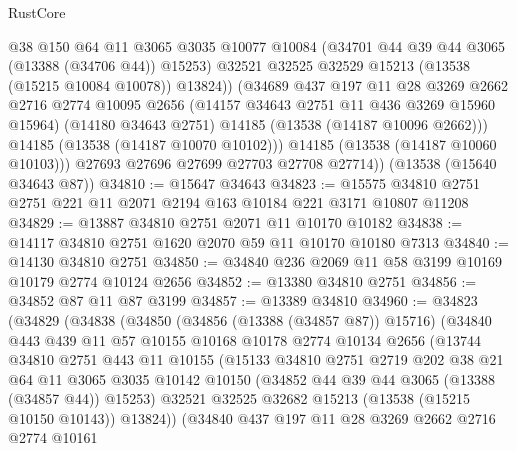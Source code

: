 \begin{lexlean}{RustCore}
\begin{coremodule}
                @38
                @150
                @64
                @11
                @3065
                @3035
                @10077
                @10084
                (@34701 @44 @39 @44 @3065 (@13388 (@34706 @44)) @15253)
                @32521
                @32525
                @32529
                @15213
                (@13538 (@15215 @10084 @10078))
                @13824))
            (@34689
              @437
              @197
              @11
              @28
              @3269
              @2662
              @2716
              @2774
              @10095
              @2656
              (@14157 @34643 @2751 @11 @436 @3269 @15960 @15964)
              (@14180 @34643 @2751)
              @14185
              (@13538 (@14187 @10096 @2662)))
            @14185
            (@13538 (@14187 @10070 @10102)))
          @14185
          (@13538 (@14187 @10060 @10103)))
        @27693
        @27696
        @27699
        @27703
        @27708
        @27714))
    (@13538 (@15640 @34643 @87))
@34810 := @15647 @34643
@34823 := @15575 @34810 @2751 @2751 @221 @11 @2071 @2194 @163 @10184 @221 @3171 @10807 @11208
@34829 := @13887 @34810 @2751 @2071 @11 @10170 @10182
@34838 := @14117 @34810 @2751 @1620 @2070 @59 @11 @10170 @10180 @7313
@34840 := @14130 @34810 @2751
@34850 := @34840 @236 @2069 @11 @58 @3199 @10169 @10179 @2774 @10124 @2656
@34852 := @13380 @34810 @2751
@34856 := @34852 @87 @11 @87 @3199
@34857 := @13389 @34810
@34960 := @34823
    (@34829
      (@34838
        (@34850
          (@34856 (@13388 (@34857 @87)) @15716)
          (@34840
            @443
            @439
            @11
            @57
            @10155
            @10168
            @10178
            @2774
            @10134
            @2656
            (@13744
              @34810
              @2751
              @443
              @11
              @10155
              (@15133
                @34810
                @2751
                @2719
                @202
                @38
                @21
                @64
                @11
                @3065
                @3035
                @10142
                @10150
                (@34852 @44 @39 @44 @3065 (@13388 (@34857 @44)) @15253)
                @32521
                @32525
                @32682
                @15213
                (@13538 (@15215 @10150 @10143))
                @13824))
            (@34840
              @437
              @197
              @11
              @28
              @3269
              @2662
              @2716
              @2774
              @10161

\end{coremodule}
\end{lexlean}
